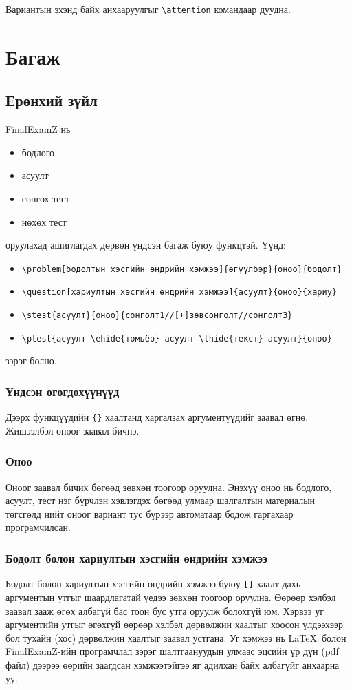 \documentclass[10pt]{article}
\theoremstyle{definition}
\begin{document}
Вариантын эхэнд байх анхааруулгыг \verb|\attention| командаар дуудна.

\section{Багаж}\label{tools}

\subsection{Ерөнхий зүйл}

FinalExamZ нь
\begin{itemize}
 \item бодлого
 \item асуулт
 \item сонгох тест
 \item нөхөх тест
\end{itemize}
оруулахад ашиглагдах дөрвөн үндсэн багаж буюу функцтэй. Үүнд:
\begin{itemize}
 \item \verb|\problem[бодолтын хэсгийн өндрийн хэмжээ]{өгүүлбэр}{оноо}{бодолт}|
 \item \verb|\question[хариултын хэсгийн өндрийн хэмжээ]{асуулт}{оноо}{хариу}|
 \item \verb|\stest{асуулт}{оноо}{сонголт1//[+]зөвсонголт//сонголт3}|
 \item \verb|\ptest{асуулт \ehide{томьёо} асуулт \thide{текст} асуулт}{оноо}|
\end{itemize}
зэрэг болно. 

\subsubsection{Үндсэн өгөгдөхүүнүүд} Дээрх функцүүдийн \texttt{\{\}} хаалтанд харгалзах аргументүүдийг заавал өгнө. Жишээлбэл оноог заавал бичнэ.

\subsubsection{Оноо} Оноог заавал бичих бөгөөд зөвхөн тоогоор оруулна. Энэхүү оноо нь бодлого, асуулт, тест нэг бүрчлэн хэвлэгдэх бөгөөд улмаар шалгалтын материалын төгсгөлд нийт оноог вариант тус бүрээр автоматаар бодож гаргахаар програмчилсан.

\subsubsection{Бодолт болон хариултын хэсгийн өндрийн хэмжээ} Бодолт болон хариултын хэсгийн өндрийн хэмжээ буюу \texttt{[]} хаалт дахь аргументын утгыг шаардлагатай үедээ зөвхөн тоогоор оруулна. Өөрөөр хэлбэл заавал зааж өгөх албагүй бас тоон бус утга оруулж болохгүй юм. Хэрвээ уг аргументийн утгыг өгөхгүй өөрөөр хэлбэл дөрвөлжин хаалтыг хоосон үлдээхээр бол тухайн (хос) дөрвөлжин хаалтыг заавал устгана. Уг хэмжээ нь \LaTeX\ болон FinalExamZ-ийн програмчлал зэрэг шалтгаануудын улмаас эцсийн үр дүн (pdf файл) дээрээ өөрийн заагдсан хэмжээтэйгээ яг адилхан байх албагүйг анхаарна уу.
\end{document}
